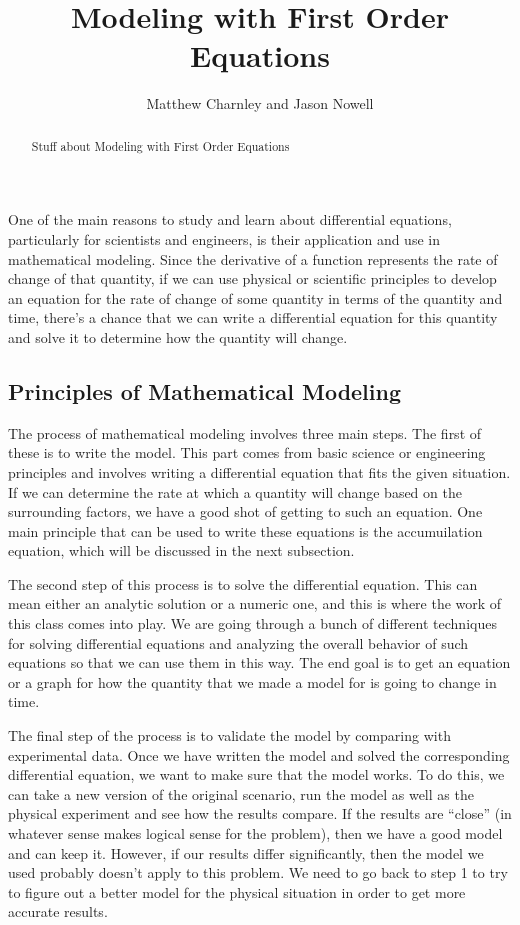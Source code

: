\documentclass{ximera}
\title{Modeling with First Order Equations}
\author{Matthew Charnley and Jason Nowell}
\begin{document}
\begin{abstract}
    Stuff about Modeling with First Order Equations
\end{abstract}
\maketitle


\label{modelfirst:section}



One of the main reasons to study and learn about differential equations, particularly for scientists and engineers, is their application and use in mathematical modeling. Since the derivative of a function represents the rate of change of that quantity, if we can use physical or scientific principles to develop an equation for the rate of change of some quantity in terms of the quantity and time, there's a chance that we can write a differential equation for this quantity and solve it to determine how the quantity will change. 

\subsection{Principles of Mathematical Modeling}

The process of mathematical modeling involves three main steps. The first of these is to write the model. This part comes from basic science or engineering principles and involves writing a differential equation that fits the given situation. If we can determine the rate at which a quantity will change based on the surrounding factors, we have a good shot of getting to such an equation. One main principle that can be used to write these equations is the accumuilation equation, which will be discussed in the next subsection. 

The second step of this process is to solve the differential equation. This can mean either an analytic solution or a numeric one, and this is where the work of this class comes into play. We are going through a bunch of different techniques for solving differential equations and analyzing the overall behavior of such equations so that we can use them in this way. The end goal is to get an equation or a graph for how the quantity that we made a model for is going to change in time.

The final step of the process is to validate the model by comparing with experimental data. Once we have written the model and solved the corresponding differential equation, we want to make sure that the model works. To do this, we can take a new version of the original scenario, run the model as well as the physical experiment and see how the results compare. If the results are ``close'' (in whatever sense makes logical sense for the problem), then we have a good model and can keep it. However, if our results differ significantly, then the model we used probably doesn't apply to this problem. We need to go back to step 1 to try to figure out a better model for the physical situation in order to get more accurate results.
\end{document}
